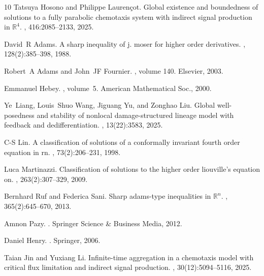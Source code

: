 \documentclass[pdflatex,sn-mathphys-num]{sn-jnl}%
\theoremstyle{thmstyleone}
\theoremstyle{thmstyletwo}
\theoremstyle{thmstylethree}
\begin{document}
\begin{thebibliography}{10}
Tatsuya Hosono and Philippe Lauren{\c{c}}ot.
\newblock Global existence and boundedness of solutions to a fully parabolic chemotaxis system with indirect signal production in $\mathbb{R}^4$.
, 416:2085--2133, 2025.

David~R Adams.
\newblock A sharp inequality of j. moser for higher order derivatives.
, 128(2):385--398, 1988.

Robert~A Adams and John~JF Fournier.
, volume 140.
\newblock Elsevier, 2003.

Emmanuel Hebey.
, volume~5.
\newblock American Mathematical Soc., 2000.

Ye~Liang, Louis~Shuo Wang, Jiguang Yu, and Zonghao Liu.
\newblock Global well-posedness and stability of nonlocal damage-structured lineage model with feedback and dedifferentiation.
, 13(22):3583, 2025.

C-S Lin.
\newblock A classification of solutions of a conformally invariant fourth order equation in rn.
, 73(2):206--231, 1998.

Luca Martinazzi.
\newblock Classification of solutions to the higher order liouville’s equation on.
, 263(2):307--329, 2009.

Bernhard Ruf and Federica Sani.
\newblock Sharp adams-type inequalities in $\mathbb{R}^n$.
, 365(2):645--670, 2013.

Amnon Pazy.
.
\newblock Springer Science \& Business Media, 2012.

Daniel Henry.
.
\newblock Springer, 2006.

Taian Jin and Yuxiang Li.
\newblock Infinite-time aggregation in a chemotaxis model with critical flux limitation and indirect signal production.
, 30(12):5094--5116, 2025.


\end{thebibliography}
\end{document}
